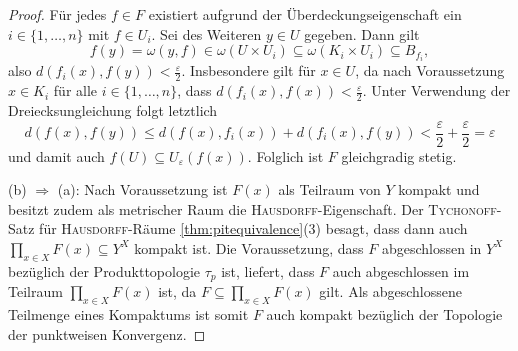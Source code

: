 \begin{proof}
  Für jedes $f \in F$ existiert aufgrund der Überdeckungseigenschaft ein $i \in \{ 1,\dots,n\}$ mit $f \in U_i$.
  Sei des Weiteren $y \in U$ gegeben.
  Dann gilt
  \begin{displaymath}
    f(y) = \omega(y,f) \in \omega(U \times U_i) \subseteq \omega(K_i \times U_i) \subseteq B_{f_i},
  \end{displaymath}
  also $d(f_i(x),f(y)) < \frac{\varepsilon}{2}$.
  Insbesondere gilt für $x \in U$, da nach Voraussetzung $x \in K_i$ für alle $i \in \{ 1,\dots,n\}$, dass $d(f_i(x),f(x)) < \frac{\varepsilon}{2}$.
  Unter Verwendung der Dreiecksungleichung folgt letztlich
  \begin{displaymath}
    d(f(x),f(y)) \leq d(f(x),f_i(x)) + d(f_i(x),f(y)) < \frac{\varepsilon}{2} + \frac{\varepsilon}{2} = \varepsilon
  \end{displaymath}
  und damit auch $f(U) \subseteq U_\varepsilon(f(x))$.
  Folglich ist $F$ gleichgradig stetig.

  (b) $\Rightarrow$ (a):
  Nach Voraussetzung ist $F(x)$ als Teilraum von $Y$ kompakt und besitzt zudem als metrischer Raum die \textsc{Hausdorff}\hyp{}Eigenschaft.
  Der \textsc{Tychonoff}\hyp{}Satz für \textsc{Hausdorff}\hyp{}Räume \ref{thm:pitequivalence}(3) besagt, dass dann auch $\prod_{x \in X} F(x) \subseteq Y^X$ kompakt ist.
  Die Voraussetzung, dass $F$ abgeschlossen in $Y^X$ bezüglich der Produkttopologie $\tau_p$ ist, liefert, dass $F$ auch abgeschlossen im Teilraum $\prod_{x \in X} F(x)$ ist, da $F \subseteq \prod_{x \in X} F(x)$ gilt.
  Als abgeschlossene Teilmenge eines Kompaktums ist somit $F$ auch kompakt bezüglich der Topologie der punktweisen Konvergenz.


\end{proof}
